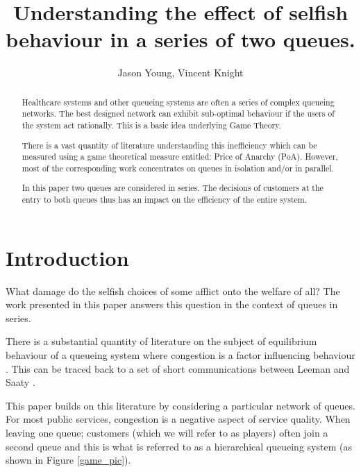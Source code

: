 \documentclass[12pt]{article}
\title{Understanding the effect of selfish behaviour in a series of two queues.}
\author{Jason Young, Vincent Knight}
\begin{document}
\maketitle

\listoftodos

\begin{abstract}

Healthcare systems and other queueing systems are often a series of complex queueing networks.
The best designed network can exhibit sub-optimal behaviour if the users of the system act rationally.
This is a basic idea underlying Game Theory.


There is a vast quantity of literature understanding this inefficiency which can be measured using a game theoretical measure entitled: Price of Anarchy (PoA).
However, most of the corresponding work concentrates on queues in isolation and/or in parallel.

In this paper two queues are considered in series.
The decisions of customers at the entry to both queues thus has an impact on the efficiency of the entire system.

\end{abstract}


\section{Introduction}\label{Introduction}

What damage do the selfish choices of some afflict onto the welfare of all?
The work presented in this paper answers this question in the context of queues in series.

There is a substantial quantity of literature on the subject of equilibrium behaviour of a queueing system where congestion is a factor influencing behaviour \cite{bell1983individual,chr1972individual,  edelson1971congestion, luski1976partial, naor1969regulation, yechiali1972customers}.
This can be traced back to a set of short communications between Leeman \cite{leeman1964reduction, leeman1965letter} and Saaty \cite{saaty1965burdens}.

This paper builds on this literature by considering a particular network of queues.
For most public services, congestion is a negative aspect of service quality.
When leaving one queue; customers (which we will refer to as players) often join a second queue and this is what is referred to as a hierarchical queueing system (as shown in Figure \ref{game_pic}).
\end{document}
